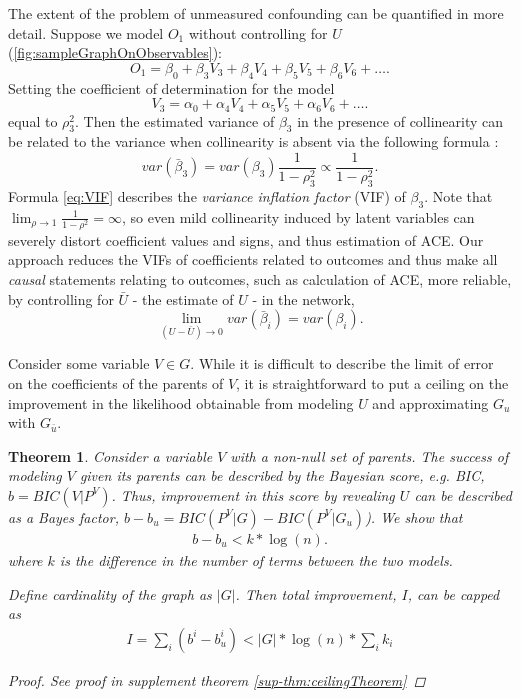 \documentclass{article}
\newtheorem{theorem}{Theorem}
\begin{document}
The extent of the problem of unmeasured confounding can be quantified in more detail.  Suppose we model $O_1$ without controlling for $U$ (\ref{fig:sampleGraphOnObservables}): $$O_1 = \beta_0 + \beta_3 V_3 + \beta_4 V_4 + \beta_5 V_5 + \beta_6 V_6 + \dots.$$  Setting the coefficient of determination for the model $$V_3 = \alpha_0 + \alpha_4 V_4 + \alpha_5 V_5 + \alpha_6 V_6 + \dots.$$ equal to $\rho_3^2$.  Then the estimated variance of $\beta_3$ in the presence of collinearity can be related to the variance when collinearity is absent via the following formula \cite{rawlings_applied_1998}:
\begin{equation}
var(\bar{\beta}_3) = var(\beta_3) \frac{1}{1-\rho_3^2} \propto \frac{1}{1-\rho_3^2}.
\label{eq:VIF}
\end{equation}
Formula \ref{eq:VIF} describes the \textit{variance inflation factor} (VIF) of $\beta_3$.  Note that $\lim_{\rho \to 1} \frac{1}{1-\rho^2} = \infty$, so even mild collinearity induced by latent variables can severely distort coefficient values and signs, and thus estimation of ACE.  Our approach reduces the VIFs of coefficients related to outcomes and thus make all \textit{causal} statements relating to outcomes, such as calculation of ACE, more reliable, by controlling for $\bar{U}$ - the estimate of $U$ - in the network,
\begin{equation}
\lim_{(U - \bar{U})\to0} var(\bar{\beta}_i) = var(\beta_i).
\label{eq:vifImprovement}
\end{equation}

Consider some variable $V \in G$.  While it is difficult to describe the limit of error on the coefficients of the parents of $V$, it is straightforward to put a ceiling on the improvement in the likelihood obtainable from modeling $U$ and approximating $G_u$ with $G_{\bar{u}}$.  
\begin{theorem}
\label{thm:ceilingTheorem}
Consider a variable $V$ with a non-null set of parents.  The success of modeling $V$ given its parents can be described by the Bayesian score, e.g. BIC, $b = BIC(V|P^V)$.  Thus, improvement in this score by revealing $U$ can be described as a Bayes factor, $b - b_u = BIC(P^V|G) - BIC(P^V|G_u)$).  We show that 
\begin{align}
b - b_u < k * \log(n).
\end{align}
where $k$ is the difference in the number of terms between the two models.

Define cardinality of the graph as $|G|$.  Then total improvement, $I$, can be capped as
\begin{align}
I = \sum_i (b^i - b^i_u) < |G| * \log(n) * \sum_i k_i
\end{align}
\begin{proof} 
See proof in supplement theorem \ref{sup-thm:ceilingTheorem}
\end{proof}
\end{theorem}
\end{document}
